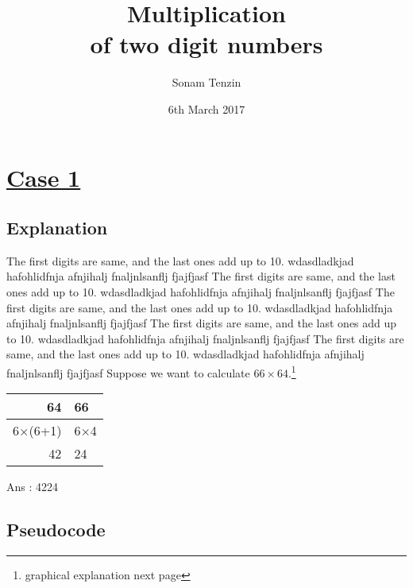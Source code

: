 \documentclass[11pt, a4paper]{article}
\title{Multiplication \\of two digit numbers}
\author{Sonam Tenzin}
\date{6th March 2017}
\begin{document}
	\maketitle
	\newpage
	\section{\underline{Case 1}}
	\subsection{Explanation}
	The first digits are same, and the last ones add up to 10. wdasdladkjad hafohlidfnja afnjihalj fnaljnlsanflj  fjajfjasf The first digits are same, and the last ones add up to 10. wdasdladkjad hafohlidfnja afnjihalj fnaljnlsanflj  fjajfjasf The first digits are same, and the last ones add up to 10. wdasdladkjad hafohlidfnja afnjihalj fnaljnlsanflj  fjajfjasf The first digits are same, and the last ones add up to 10. wdasdladkjad hafohlidfnja afnjihalj fnaljnlsanflj  fjajfjasf
	The first digits are same, and the last ones add up to 10. wdasdladkjad hafohlidfnja afnjihalj fnaljnlsanflj  fjajfjasf
	Suppose we want to calculate $66 \times 64$.\footnote{graphical explanation next page}\\
	

	{\begin{center}
	\begin{tabular}{rl}
		64 & 66\\
		\hline
		 6$\times$(6+1) & 6$\times$4\\
		 42 & 24\\
		 
	\end{tabular}
	\end{center}}
	Ans : 4224
		
	\subsection{Pseudocode}\label{B1}
	\begin{algorithm}
		{}
	\end{algorithm}
		
\end{document}
